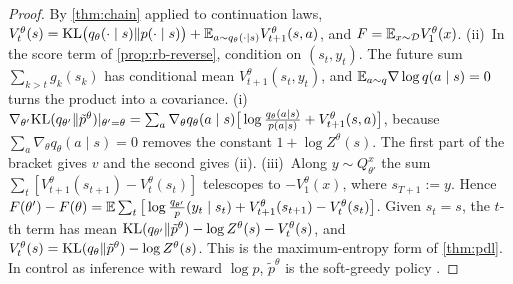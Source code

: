 \begin{proof}
By \cref{thm:chain} applied to continuation laws, $V^\theta_t(s)=\mathrm{KL}\big(q_\theta(\cdot\mid s)\|p(\cdot\mid s)\big)+\mathbb{E}_{a\sim q_\theta(\cdot\mid s)}V^\theta_{t+1}(s,a)$, and
$F=\mathbb{E}_{x\sim\mathcal{D}}V^\theta_1(x)$. (ii)~In the score term of \cref{prop:rb-reverse}, condition on $(s_t,y_t)$. The future sum
$\sum_{k>t}g_k(s_k)$ has conditional mean $V^\theta_{t+1}(s_t,y_t)$, and $\mathbb{E}_{a\sim q}\nabla\log q(a\mid s)=0$ turns the product into a
covariance. (i)~$\nabla_{\theta'}\mathrm{KL}(q_{\theta'}\|\tilde p^\theta)|_{\theta'=\theta}=\sum_a\nabla_\theta q_\theta(a\mid s)\big[\log\frac{q_\theta(a\mid s)}{p(a\mid s)}+V^\theta_{t+1}(s,a)\big]$, because
$\sum_a\nabla_\theta q_\theta(a\mid s)=0$ removes the constant $1+\log Z^\theta(s)$. The first part of the bracket gives $v$ and the second gives
(ii). (iii)~Along $y\sim Q^x_{\theta'}$ the sum $\sum_t[V^\theta_{t+1}(s_{t+1})-V^\theta_t(s_t)]$ telescopes to $-V^\theta_1(x)$, where $s_{T+1}:=y$. Hence
$F(\theta')-F(\theta)=\mathbb{E}\sum_t\big[\log\frac{q_{\theta'}}{p}(y_t\mid s_t)+V^\theta_{t+1}(s_{t+1})-V^\theta_t(s_t)\big]$. Given $s_t=s$, the $t$-th term has mean
$\mathrm{KL}(q_{\theta'}\|\tilde p^\theta)-\log Z^\theta(s)-V^\theta_t(s)$, and $V^\theta_t(s)=\mathrm{KL}(q_\theta\|\tilde p^\theta)-\log Z^\theta(s)$. This is the maximum-entropy form of
\cref{thm:pdl}. In control as inference with reward $\log p$, $\tilde p^\theta$ is the soft-greedy policy
\citep{levine2018reinforcement}.
\end{proof}

